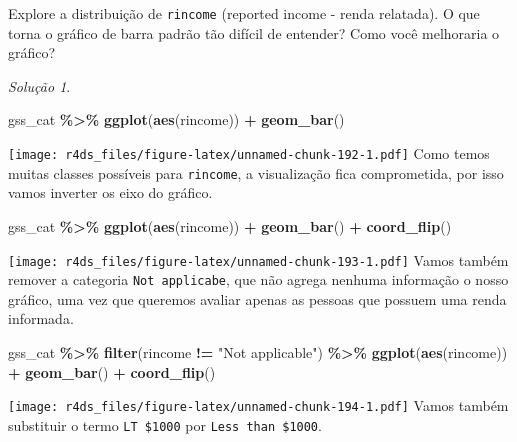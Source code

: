 \documentclass[
]{latex/krantz}
\newenvironment{Shaded}{\begin{snugshade}}{\end{snugshade}}
\newcommand{\FunctionTok}[1]{\textcolor[rgb]{0.13,0.29,0.53}{\textbf{#1}}}
\newcommand{\NormalTok}[1]{#1}
\newcommand{\SpecialCharTok}[1]{\textcolor[rgb]{0.81,0.36,0.00}{\textbf{#1}}}
\newcommand{\StringTok}[1]{\textcolor[rgb]{0.31,0.60,0.02}{#1}}
\theoremstyle{definition}
\theoremstyle{definition}
\theoremstyle{definition}
\theoremstyle{definition}
\theoremstyle{remark}
\newtheorem*{solution}{Solução}
\begin{document}
Explore a distribuição de \texttt{rincome} (reported income - renda relatada). O que torna o gráfico de barra padrão tão difícil de entender? Como você melhoraria o gráfico?

\begin{solution}
\leavevmode

\begin{Shaded}
\begin{Highlighting}[]
\NormalTok{gss\_cat }\SpecialCharTok{\%\textgreater{}\%}
  \FunctionTok{ggplot}\NormalTok{(}\FunctionTok{aes}\NormalTok{(rincome)) }\SpecialCharTok{+}
    \FunctionTok{geom\_bar}\NormalTok{()}
\end{Highlighting}
\end{Shaded}

\texttt{[image: r4ds\_files/figure-latex/unnamed-chunk-192-1.pdf]}
Como temos muitas classes possíveis para \texttt{rincome}, a visualização fica comprometida, por isso vamos inverter os eixo do gráfico.

\begin{Shaded}
\begin{Highlighting}[]
\NormalTok{gss\_cat }\SpecialCharTok{\%\textgreater{}\%}
  \FunctionTok{ggplot}\NormalTok{(}\FunctionTok{aes}\NormalTok{(rincome)) }\SpecialCharTok{+}
    \FunctionTok{geom\_bar}\NormalTok{() }\SpecialCharTok{+}
    \FunctionTok{coord\_flip}\NormalTok{()}
\end{Highlighting}
\end{Shaded}

\texttt{[image: r4ds\_files/figure-latex/unnamed-chunk-193-1.pdf]}
Vamos também remover a categoria \texttt{Not\ applicabe}, que não agrega nenhuma informação o nosso gráfico, uma vez que queremos avaliar apenas as pessoas que possuem uma renda informada.

\begin{Shaded}
\begin{Highlighting}[]
\NormalTok{gss\_cat }\SpecialCharTok{\%\textgreater{}\%}
  \FunctionTok{filter}\NormalTok{(rincome }\SpecialCharTok{!=} \StringTok{"Not applicable"}\NormalTok{) }\SpecialCharTok{\%\textgreater{}\%}
  \FunctionTok{ggplot}\NormalTok{(}\FunctionTok{aes}\NormalTok{(rincome)) }\SpecialCharTok{+}
    \FunctionTok{geom\_bar}\NormalTok{() }\SpecialCharTok{+} 
    \FunctionTok{coord\_flip}\NormalTok{()}
\end{Highlighting}
\end{Shaded}

\texttt{[image: r4ds\_files/figure-latex/unnamed-chunk-194-1.pdf]}
Vamos também substituir o termo \texttt{LT\ \$1000} por \texttt{Less\ than\ \$1000}.


\end{solution}
\end{document}
